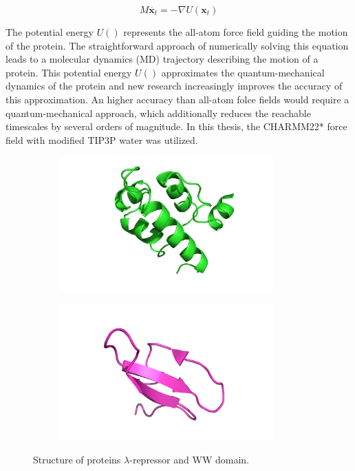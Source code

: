 $$M\ddot{\mathbf{x}_{t}}=-\nabla U(\mathbf{x}_{t})$$

The potential energy $U()$ represents the all-atom force field guiding the motion of the protein. The straightforward approach of numerically solving this equation leads to a molecular dynamics (MD) trajectory describing the motion of a protein. This potential energy $U()$ approximates the quantum-mechanical dynamics of the protein and new research increasingly improves the accuracy of this approximation. An higher accuracy than all-atom folce fields would require a quantum-mechanical approach, which additionally reduces the reachable timescales by several orders of magnitude. In this thesis, the CHARMM22* force field \cite{Charmm22star} with modified TIP3P water was utilized.

\begin{figure}[H]
  \centering
  \begin{subfigure}[t]{0.45\textwidth}
    \includegraphics[width=0.9\textwidth]{figures3/lambda-repressor.png} 
  \end{subfigure}
  \begin{subfigure}[t]{0.45\textwidth}
    \includegraphics[width=0.9\textwidth]{figures3/ww-domain.png}  
  \end{subfigure}
  \caption{Structure of proteins $\lambda$-repressor and WW domain.}
  \label{fig:proteins}
\end{figure}


